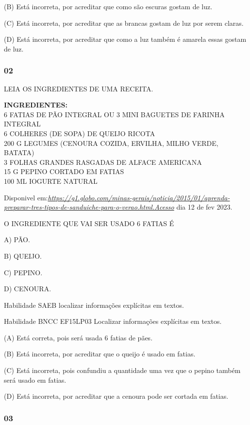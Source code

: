 (B) Está incorreta, por acreditar que como são escuras gostam de luz.

(C) Está incorreta, por acreditar que as brancas gostam de luz por serem
claras.

(D) Está incorreta, por acreditar que como a luz também é amarela essas
gostam de luz.

\subsubsection{02}\label{section-9}

LEIA OS INGREDIENTES DE UMA RECEITA.

\textbf{INGREDIENTES:}\\
6 FATIAS DE PÃO INTEGRAL OU 3 MINI BAGUETES DE FARINHA INTEGRAL\\
6 COLHERES (DE SOPA) DE QUEIJO RICOTA\\
200 G LEGUMES (CENOURA COZIDA, ERVILHA, MILHO VERDE, BATATA)\\
3 FOLHAS GRANDES RASGADAS DE ALFACE AMERICANA\\
15 G PEPINO CORTADO EM FATIAS\\
100 ML IOGURTE NATURAL

Disponivel
em:\href{https://g1.globo.com/minas-gerais/noticia/2015/01/aprenda-preparar-tres-tipos-de-sanduiche-para-o-verao.html.Acesso}{\emph{https://g1.globo.com/minas-gerais/noticia/2015/01/aprenda-preparar-tres-tipos-de-sanduiche-para-o-verao.html.Acesso}}
dia 12 de fev 2023.

O INGREDIENTE QUE VAI SER USADO 6 FATIAS É

A) PÃO.

B) QUEIJO.

C) PEPINO.

D) CENOURA.

Habilidade SAEB localizar informações explícitas em textos.

Habilidade BNCC EF15LP03 Localizar informações explícitas em textos.

(A) Está correta, pois será usada 6 fatias de pães.

(B) Está incorreta, por acreditar que o queijo é usado em fatias.

(C) Está incorreta, pois confundiu a quantidade uma vez que o pepino
também será usado em fatias.

(D) Está incorreta, por acreditar que a cenoura pode ser cortada em
fatias.

\subsubsection{03}\label{section-10}

